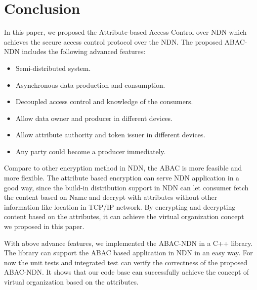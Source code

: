 \section{Conclusion}

In this paper, we proposed the Attribute-based Access Control over NDN which achieves the secure access control protocol over the NDN. The proposed ABAC-NDN includes the following advanced features:

\begin{itemize}
	\item Semi-distributed system.
	\item Asynchronous data production and consumption.
	\item Decoupled access control and knowledge of the consumers.
	\item Allow data owner and producer in different devices.
	\item Allow attribute authority and token issuer in different devices.
	\item Any party could become a producer immediately.
\end{itemize}

Compare to other encryption method in NDN, the ABAC is more feasible and more flexible. The attribute based encryption can serve NDN application in a good way, since the build-in distribution support in NDN can let consumer fetch the content based on Name and decrypt with attributes without other information like location in TCP/IP network. By encrypting and decrypting content based on the attributes, it can achieve the virtual organization concept we proposed in this paper.

With above advance features, we implemented the ABAC-NDN in a C++ library. The library can support the ABAC based application in NDN in an easy way. For now the unit tests and integrated test can verify the correctness of the proposed ABAC-NDN. It shows that our code base can successfully achieve the concept of virtual organization based on the attributes.
